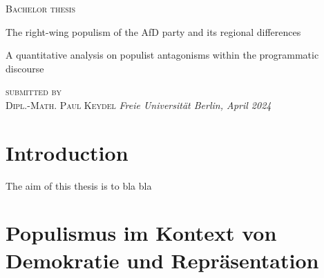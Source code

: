 \documentclass[a4paper]{scrreprt}
\begin{document}
\begin{titlepage}
\centering
{\large\textsc{Bachelor thesis}\par}
\vspace{8\baselineskip}
{\Huge The right-wing populism of the AfD party and its regional differences\par}
\vspace{2\baselineskip}
{\Large A quantitative analysis on populist antagonisms within the programmatic discourse\par}
\vspace{5\baselineskip}
{\large\textsc{submitted by\\[.5em]Dipl.-Math. Paul Keydel}}
\vfill
{\em Freie Universität Berlin, April 2024}
\end{titlepage}

\tableofcontents

\chapter{Introduction}
The aim of this thesis is to bla bla

\chapter{Populismus im Kontext von Demokratie und Repräsentation}
\end{document}

